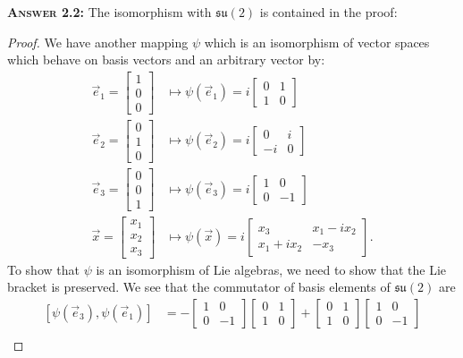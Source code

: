 \medbreak\noindent\textsc{\textbf{Answer 2.2:\enspace}}
The isomorphism with $\mathfrak{su}(2)$ is contained in the proof:
\begin{proof}
We have another mapping $\psi$ which is an isomorphism of vector
spaces which behave on basis vectors and an arbitrary vector by:
\begin{subequations}
\begin{align}
\vec{e}_{1}=\begin{bmatrix}1\\0\\0\end{bmatrix}&\mapsto\psi(\vec{e}_{1})=
i\begin{bmatrix}0 & 1\\1 & 0\end{bmatrix}\\
\vec{e}_{2}=\begin{bmatrix}0\\1\\0\end{bmatrix}&\mapsto\psi(\vec{e}_{2})=
i\begin{bmatrix}0&i\\-i&0\end{bmatrix}\\
\vec{e}_{3}=\begin{bmatrix}0\\0\\1\end{bmatrix}&\mapsto\psi(\vec{e}_{3})=
i\begin{bmatrix}1&0\\0&-1\end{bmatrix}\\
\vec{x}=\begin{bmatrix}x_{1}\\x_{2}\\x_{3}\end{bmatrix}
&\mapsto \psi(\vec{x})=i\begin{bmatrix}
x_{3} & x_{1}-ix_{2}\\
x_{1}+ix_{2}&-x_{3}
\end{bmatrix}.
\end{align}
\end{subequations}
To show that $\psi$ is an isomorphism of Lie algebras, we need to
show that the Lie bracket is preserved. We see that the
commutator of basis elements of $\mathfrak{su}(2)$ are
\begin{subequations}
\begin{align}
[\psi(\vec{e}_{3}),\psi(\vec{e}_{1})]&=-\begin{bmatrix}1&0\\0&-1\end{bmatrix}\begin{bmatrix}0 & 1\\1 & 0\end{bmatrix}+\begin{bmatrix}0 & 1\\1 & 0\end{bmatrix}\begin{bmatrix}1&0\\0&-1\end{bmatrix}\\

\end{align}
\end{subequations}
\end{proof}
